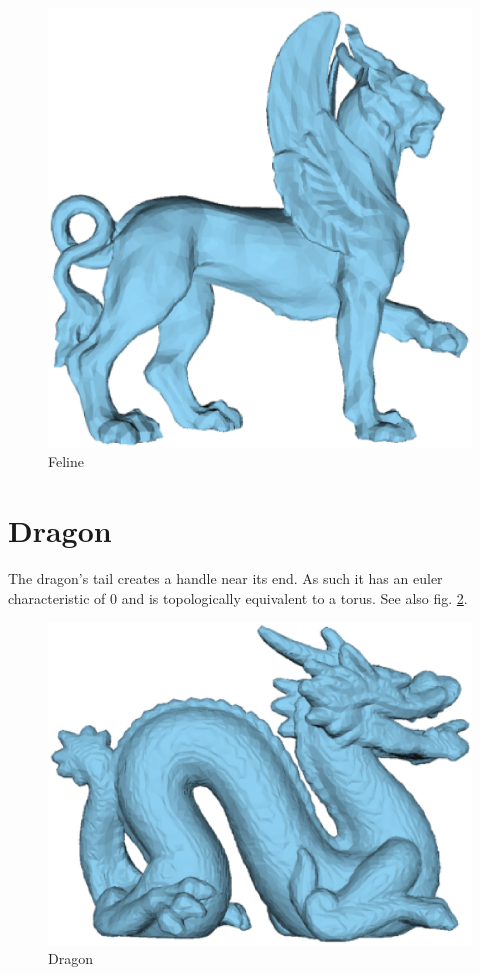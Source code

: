 \documentclass[a4paper,10pt,notitlepage]{scrreprt}
\begin{document}
\begin{figure}
  \centering

  \includegraphics[scale=0.5]{feline.eps}

  \caption{Feline}
  \label{fig:feline}
\end{figure}

\section{Dragon}

The dragon's tail creates a handle near its end. As such it has an euler
characteristic of $0$ and is topologically equivalent to a torus. See also fig.
\ref{fig:dragon}.

\begin{figure}
  \centering

  \includegraphics[scale=0.5]{dragon.eps}

  \caption{Dragon}
  \label{fig:dragon}
\end{figure}
\end{document}
